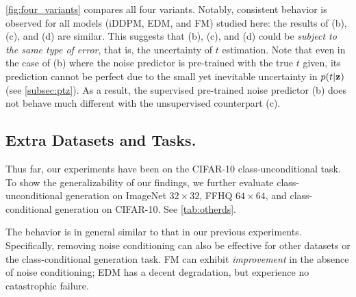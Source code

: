 \cref{fig:four_variants} compares all four variants.
Notably, consistent behavior is observed for all models (iDDPM, EDM, and FM) studied here: the results of (b), (c), and (d) are similar. This suggests that (b), (c), and (d) could be \textit{subject to the same type of error}, that is, the uncertainty of $t$ estimation. Note that even in the case of (b) where the noise predictor is pre-trained with the true $t$ given, its prediction cannot be perfect due to the small yet inevitable uncertainty in $p(t|{\mathbf{z}})$ (see \cref{subsec:ptz}). As a result, the supervised pre-trained noise predictor (b) does not behave much different with the unsupervised counterpart (c).

\subsection{Extra Datasets and Tasks.}

Thus far, our experiments have been on the CIFAR-10 class-unconditional task.
To show the generalizability of our findings, we further evaluate class-unconditional generation on ImageNet $32{\times}32$, FFHQ $64{\times}64$, and class-conditional generation on CIFAR-10. See \cref{tab:otherds}.

The behavior is in general similar to that in our previous experiments. Specifically, removing noise conditioning can also be effective for other datasets or the class-conditional generation task. FM can exhibit \textit{improvement} in the absence of noise conditioning; EDM has a decent degradation, but experience no catastrophic failure. 

